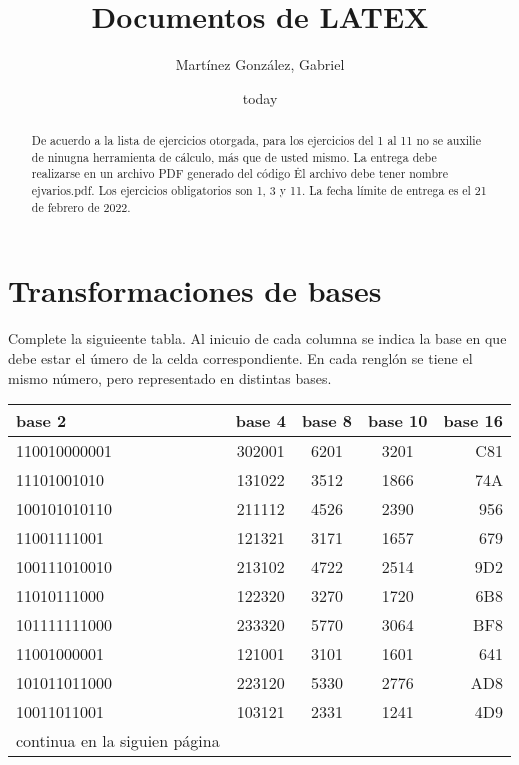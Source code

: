 \documentclass[12pt]{article}
\author{Mart\'{i}nez Gonz\'alez, Gabriel}
\date{today}
\title{Documentos de LATEX}
\begin{document}
\maketitle

\begin{abstract}

	De acuerdo a la lista de ejercicios otorgada, para los ejercicios del 1 al 11 no se auxilie de ninugna herramienta de c\'alculo, m\'as que de usted mismo. La entrega debe realizarse en un archivo PDF generado del c\'odigo \LATEX\. El archivo debe tener nombre ejvarios.pdf. Los ejercicios obligatorios son 1, 3 y 11. La fecha límite de entrega es el 21 de febrero de 2022.

\end{abstract}

\section{Transformaciones de bases}

Complete la siguieente tabla. Al inicuio de cada columna se indica la base en que debe estar el \'umero de la celda correspondiente. En cada rengl\'on se tiene el mismo n\'umero, pero representado en distintas bases.

\begin{center}
\begin{tabular}{||l|c|c|c|r||}

\hline
base 2 & base 4 & base 8 & base 10 & base 16 \\ \hline
110010000001 & 302001 & 6201 & 3201 & C81 \\ \hline
11101001010 & 131022 & 3512 & 1866 & 74A \\ \hline
100101010110 & 211112 & 4526 & 2390 & 956 \\ \hline
11001111001 & 121321 & 3171 & 1657 & 679 \\ \hline
100111010010 & 213102 & 4722 & 2514 & 9D2 \\ \hline
11010111000 & 122320 & 3270 & 1720 & 6B8 \\ \hline
101111111000 & 233320 & 5770 & 3064 & BF8 \\ \hline
11001000001 & 121001 & 3101 & 1601 & 641 \\ \hline
101011011000 & 223120 & 5330 & 2776 & AD8 \\ \hline
10011011001 & 103121 & 2331 & 1241 & 4D9 \\ \hline
continua en la siguien p\'agina \\ \hline

\end{tabular}
\end{center}
\end{document}
